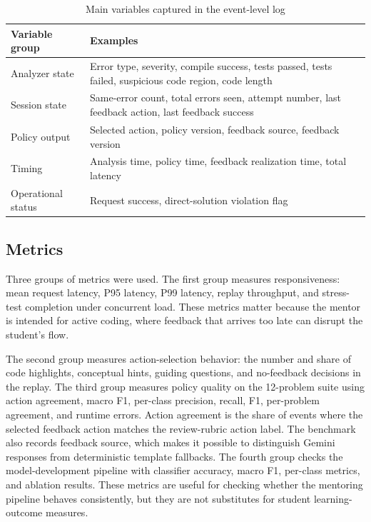 \documentclass[11pt]{article}
\begin{document}
\begin{table}[htbp]
\centering
\caption{Main variables captured in the event-level log}
\label{tab:variables}
\small
\renewcommand{\arraystretch}{1.15}
\begin{tabular}{p{} p{}}
\toprule
\textbf{Variable group} & \textbf{Examples} \\
\midrule
Analyzer state & Error type, severity, compile success, tests passed, tests failed, suspicious code region, code length \\
Session state & Same-error count, total errors seen, attempt number, last feedback action, last feedback success \\
Policy output & Selected action, policy version, feedback source, feedback version \\
Timing & Analysis time, policy time, feedback realization time, total latency \\
Operational status & Request success, direct-solution violation flag \\
\bottomrule
\end{tabular}
\end{table}

\subsection{Metrics}

Three groups of metrics were used. The first group measures responsiveness: mean request latency, P95 latency, P99 latency, replay throughput, and stress-test completion under concurrent load. These metrics matter because the mentor is intended for active coding, where feedback that arrives too late can disrupt the student's flow.

The second group measures action-selection behavior: the number and share of code highlights, conceptual hints, guiding questions, and no-feedback decisions in the replay. The third group measures policy quality on the 12-problem suite using action agreement, macro F1, per-class precision, recall, F1, per-problem agreement, and runtime errors. Action agreement is the share of events where the selected feedback action matches the review-rubric action label. The benchmark also records feedback source, which makes it possible to distinguish Gemini responses from deterministic template fallbacks. The fourth group checks the model-development pipeline with classifier accuracy, macro F1, per-class metrics, and ablation results. These metrics are useful for checking whether the mentoring pipeline behaves consistently, but they are not substitutes for student learning-outcome measures.
\end{document}
